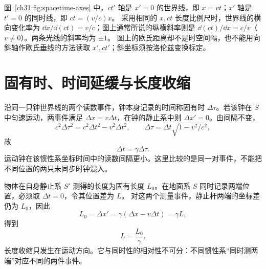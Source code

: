 \begin{center}\begin{minipage}{\linewidth}\centering

\end{minipage}\end{center}
图~\ref{ch31:fig:spacetime-axes} 中，$ct'$ 轴是 $x'=0$ 的世界线，即 $x=vt$；$x'$ 轴是 $t'=0$ 的同时线，即 $ct=(v/c)x$。
采用相同的 $x,ct$ 长度比例尺时，世界线的横向变化率为 $\dd x/\dd(ct)=v/c$；图上通常所说的纵横斜率则是 $\dd(ct)/\dd x=c/v$（$v\ne0$）。两条光线的斜率均为 $\pm1$。
图上的欧氏距离却不是时空间隔，也不能用向斜轴作欧氏垂线的方法读取 $x',ct'$；斜坐标须按洛伦兹变换标定。

\section{固有时、时间延缓与长度收缩}

沿同一只钟世界线的两个读数事件，钟本身记录的时间称固有时 $\Delta\tau$。若该钟在 $S$ 中匀速运动，两事件满足
$\Delta x=v\Delta t$，在钟的静止系中则 $\Delta x'=0$。由间隔不变，
\[
 c^2\Delta\tau^2=c^2\Delta t^2-v^2\Delta t^2,
 \qquad \Delta\tau=\Delta t\sqrt{1-v^2/c^2},
\]
故
\begin{equation}
 \Delta t=\gamma\Delta\tau.
\end{equation}
运动钟在该惯性系坐标时间中的读数间隔更小。这里比较的是同一对事件，不能把不同位置的两只未同步时钟混入。

物体在自身静止系 $S'$ 测得的长度为固有长度 $L_0$。在地面系 $S$ 同时记录两端位置，必须取 $\Delta t=0$，令其位置差为 $L$。
对这两个测量事件，静止杆两端的坐标差仍为 $L_0$，因此
\[
 L_0=\Delta x'=\gamma(\Delta x-v\Delta t)=\gamma L,
\]
得到
\begin{equation}
 L=\frac{L_0}{\gamma}.
\end{equation}
长度收缩只发生在运动方向。它与同时性的相对性不可分：不同惯性系“同时测两端”对应不同的两件事件。

